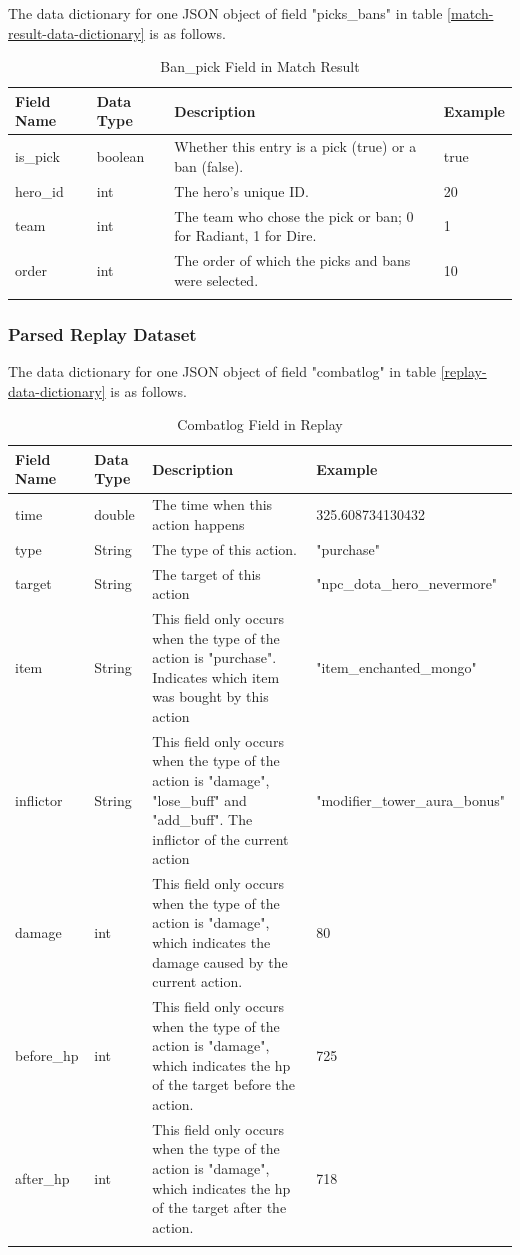 \documentclass{article}
\begin{document}
The data dictionary for one JSON object of field "picks\_bans" in table \ref{match-result-data-dictionary} is as follows.

\begin{longtable}{|p{2.5cm}|p{2cm}|p{5.5cm}|p{3cm}|}

\hline
\textbf{Field Name} & \textbf{Data Type} & \textbf{Description}  & \textbf{Example} \\
\hline
\endhead

is\_pick & boolean & Whether this entry is a pick (true) or a ban (false). & true \\
\hline
hero\_id & int & The hero's unique ID. & 20 \\
\hline
team & int & The team who chose the pick or ban; 0 for Radiant, 1 for Dire. & 1 \\
\hline
order & int & The order of which the picks and bans were selected. & 10 \\
\hline
\caption{Ban\_pick Field in Match Result}
\label{ban-pick-in-match-result}
\end{longtable}

\subsubsection{Parsed Replay Dataset}


The data dictionary for one JSON object of field "combatlog" in table \ref{replay-data-dictionary} is as follows.

\begin{longtable}{|p{2.5cm}|p{2cm}|p{5.5cm}|p{3cm}|}

\hline
\textbf{Field Name} & \textbf{Data Type} & \textbf{Description}  & \textbf{Example} \\
\hline
\endhead

time & double & The time when this action happens & 325.608734130432 \\
\hline
type & String & The type of this action. & "purchase" \\
\hline
target & String & The target of this action & "npc\_dota\_hero\_nevermore" \\
\hline
item & String & This field only occurs when the type of the action is "purchase". Indicates which item was bought by this action & "item\_enchanted\_mongo" \\
\hline
inflictor & String & This field only occurs when the type of the action is "damage", "lose\_buff" and "add\_buff". The inflictor of the current action & "modifier\_tower\_aura\_bonus" \\
\hline
damage & int & This field only occurs when the type of the action is "damage", which indicates the damage caused by the current action. & 80 \\
\hline
before\_hp & int &  This field only occurs when the type of the action is "damage", which indicates the hp of the target before the action. & 725 \\
\hline
after\_hp & int &  This field only occurs when the type of the action is "damage", which indicates the hp of the target after the action. & 718 \\
\hline
\caption{Combatlog Field in Replay}
\label{combat-field-in-replay}
\end{longtable}
\end{document}
